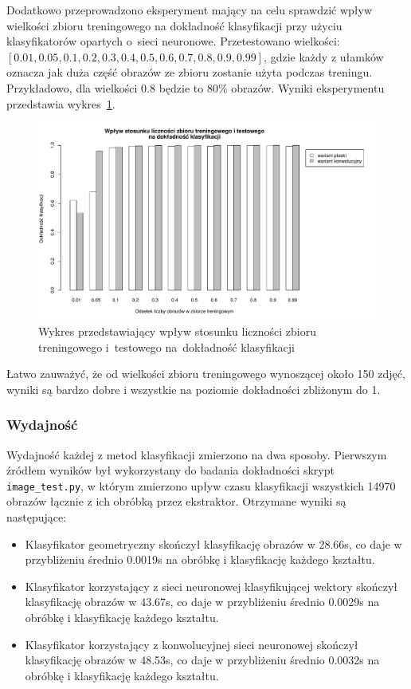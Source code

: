\documentclass[11pt,a4paper]{article}
\begin{document}
Dodatkowo przeprowadzono eksperyment mający na celu sprawdzić wpływ wielkości zbioru treningowego na dokładność klasyfikacji przy użyciu klasyfikatorów opartych o~sieci neuronowe. Przetestowano wielkości: $[0.01, 0.05, 0.1, 0.2, 0.3, 0.4, 0.5, 0.6, 0.7, 0.8, 0.9, 0.99]$, gdzie każdy z ułamków oznacza jak duża część obrazów ze zbioru \cite{shapes} zostanie użyta podczas treningu. Przykładowo, dla wielkości 0.8 będzie to 80\% obrazów.
Wyniki eksperymentu przedstawia wykres~\ref{fig:test-train-proportions}.

\begin{figure}
    \centering
    \includegraphics[width=\textwidth]{res/img/test-train-proportions.pdf}
    \caption{Wykres przedstawiający wpływ stosunku liczności zbioru treningowego i~testowego na~dokładność klasyfikacji}
    \label{fig:test-train-proportions}
\end{figure}

Łatwo zauważyć, że od wielkości zbioru treningowego wynoszącej około 150 zdjęć, wyniki są bardzo dobre i wszystkie na poziomie dokładności zbliżonym do 1.

\subsubsection{Wydajność}

Wydajność każdej z metod klasyfikacji zmierzono na dwa sposoby. Pierwszym źródłem wyników był wykorzystany do badania dokładności skrypt \verb+image_test.py+, w którym zmierzono upływ czasu klasyfikacji wszystkich 14970 obrazów łącznie z ich obróbką przez ekstraktor. Otrzymane wyniki są następujące:
\begin{itemize}
    \item Klasyfikator geometryczny skończył klasyfikację obrazów w 28.66s, co daje w przybliżeniu średnio 0.0019s na obróbkę i klasyfikację każdego kształtu.
    \item Klasyfikator korzystający z sieci neuronowej klasyfikującej wektory skończył klasyfikację obrazów w 43.67s, co daje w przybliżeniu średnio 0.0029s na obróbkę i klasyfikację każdego kształtu.
    \item Klasyfikator korzystający z konwolucyjnej sieci neuronowej skończył klasyfikację obrazów w 48.53s, co daje w przybliżeniu średnio 0.0032s na obróbkę i klasyfikację każdego kształtu.
\end{itemize}
\end{document}
